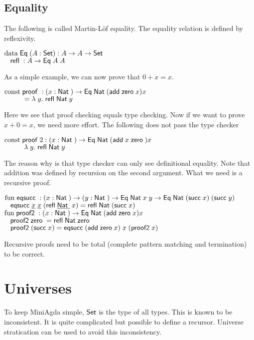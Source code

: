 \subsection{Equality}
The following is called Martin-L\"of equality.
The equality relation is defined by reflexivity.
\begin{bsp}
$\mathrm{data}\; \mathsf{Eq}\; ( A : \mathsf{Set} ) : A \rightarrow A \rightarrow \mathsf{Set} $ \\
$\hspace*{3mm} \mathsf{refl}\; : A \rightarrow \mathsf{Eq}\; A \; A  $
\end{bsp}
As a simple example, we can now prove that $ 0 + x = x $.
\begin{bsp}
$ \mathrm{const}\; \mathsf{proof}\; : ( x : \mathsf{Nat}\; ) \rightarrow{\mathsf{Eq}\;\mathsf{Nat}\;(\mathsf{add}\;\mathsf{zero}\;x) x} $ \\ 
$ \spcx = \lam{y}\refl \Nat y$ 
\end{bsp}
Here we see that proof checking equals type checking.
Now if we want to prove $ x + 0 = x $, we need more effort.
The following does not pass the type checker
\begin{bsp}
$ \mathrm{const}\; \mathsf{proof}\;2 : ( x : \mathsf{Nat}\; ) \rightarrow{\mathsf{Eq}\;\mathsf{Nat}\;(\mathsf{add}\;x \; \mathsf{zero}\;)  x} $ \\ 
$ \spcx \lam{y} \refl \Nat y$ 
\end{bsp}
The reason why is that type checker can only see definitional equality.
Note that addition was defined by recursion on the second argument. 
What we need is a recursive proof.

\begin{bsp}
$\mathrm{fun}\; \mathsf{eqsucc}\; : ( x : \mathsf{Nat}\; ) \rightarrow( y : \mathsf{Nat}\; ) \rightarrow \mathsf{Eq}\; \mathsf{Nat}\; x \; y \rightarrow \mathsf{Eq}\; \mathsf{Nat}\; (\mathsf{succ}\; x) \; (\mathsf{succ}\; y)$ \\
$\hspace*{3mm} \mathsf{eqsucc}\; \underline{x} \; \underline{x} \; (\mathsf{refl}\; \underline{\mathsf{Nat}\;} \; x) = \mathsf{refl}\; \mathsf{Nat}\; (\mathsf{succ}\; x)$\\
$\mathrm{fun}\; \mathsf{proof2}\; : ( x : \mathsf{Nat}\; ) \rightarrow \mathsf{Eq}\; \mathsf{Nat}\; (\mathsf{add}\; \mathsf{zero}\; x) x$\\
$\hspace*{3mm} \mathsf{proof2}\; \mathsf{zero}\; = \mathsf{refl}\; \mathsf{Nat}\; \mathsf{zero}\;$\\
$\hspace*{3mm} \mathsf{proof2}\; (\mathsf{succ}\; x) = \mathsf{eqsucc}\; (\mathsf{add}\; \mathsf{zero}\; x)\; x \; (\mathsf{proof2}\; x)$
\end{bsp}

Recursive proofs need to be total (complete pattern matching and termination) to be correct.

\section{Universes}
To keep MiniAgda simple, $\mathsf{Set}$ is the type of all types.
This is known to be inconsistent.
It is quite complicated but possible to define a recursor.
Universe stratication can be used to avoid this inconsistency.

